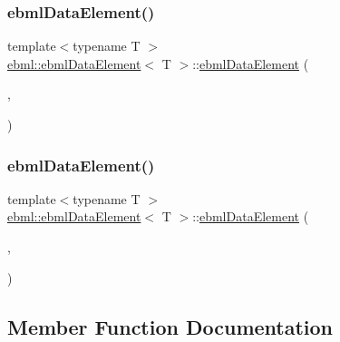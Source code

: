 \subsubsection{\texorpdfstring{ebml\+Data\+Element()}{ebmlDataElement()}\hspace{0.1cm}{\footnotesize\ttfamily [1/2]}}
{\footnotesize\ttfamily template$<$typename T $>$ \\
\mbox{\hyperlink{classebml_1_1ebmlDataElement}{ebml\+::ebml\+Data\+Element}}$<$ T $>$\+::\mbox{\hyperlink{classebml_1_1ebmlDataElement}{ebml\+Data\+Element}} (\begin{DoxyParamCaption}\item[{const \mbox{\hyperlink{classebml_1_1ebmlDataElementClass}{ebml\+Data\+Element\+Class}}$<$ T $>$ $\ast$}]{,  }\item[{const T \&}]{ }\end{DoxyParamCaption})\hspace{0.3cm}{\ttfamily [protected]}}

\mbox{\label{classebml_1_1ebmlDataElement_a6006b80fd6faec7d0cc46a597c7073dc}} 
\subsubsection{\texorpdfstring{ebml\+Data\+Element()}{ebmlDataElement()}\hspace{0.1cm}{\footnotesize\ttfamily [2/2]}}
{\footnotesize\ttfamily template$<$typename T $>$ \\
\mbox{\hyperlink{classebml_1_1ebmlDataElement}{ebml\+::ebml\+Data\+Element}}$<$ T $>$\+::\mbox{\hyperlink{classebml_1_1ebmlDataElement}{ebml\+Data\+Element}} (\begin{DoxyParamCaption}\item[{const \mbox{\hyperlink{classebml_1_1ebmlDataElementClass}{ebml\+Data\+Element\+Class}}$<$ T $>$ $\ast$}]{,  }\item[{T \&\&}]{ }\end{DoxyParamCaption})\hspace{0.3cm}{\ttfamily [protected]}}



\subsection{Member Function Documentation}
\mbox{\label{classebml_1_1ebmlDataElement_abc9e99cdc566a08b2334e55374dc5f5a}} 
